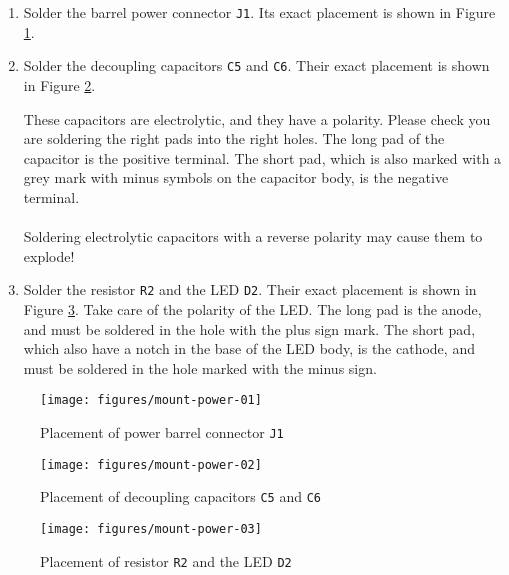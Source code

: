 \begin{enumerate}
  \item Solder the barrel power connector {\tt J1}. Its exact placement is shown in Figure \ref{fig:mount-power-01}.
  \item Solder the decoupling capacitors {\tt C5} and {\tt C6}. Their exact placement is shown in Figure \ref{fig:mount-power-02}.

        \begin{warning}
          These capacitors are electrolytic, and they have a polarity. Please check you are soldering the right pads into the right holes. The long pad of the capacitor is the positive terminal. The short pad, which is also marked with a grey mark with minus symbols on the capacitor body, is the negative terminal.\\\\

          Soldering electrolytic capacitors with a reverse polarity may cause them to explode!
        \end{warning}
  \item Solder the resistor {\tt R2} and the LED {\tt D2}. Their exact placement is shown in Figure \ref{fig:mount-power-03}. Take care of the polarity of the LED. The long pad is the anode, and must be soldered in the hole with the plus sign mark. The short pad, which also have a notch in the base of the LED body, is the cathode, and must be soldered in the hole marked with the minus sign.
\end{enumerate}

\begin{figure}[htbp]
  \centering
  \texttt{[image: figures/mount-power-01]}
  \caption{Placement of power barrel connector {\tt J1}}
  \label{fig:mount-power-01}
\end{figure}

\begin{figure}[htbp]
  \centering
  \texttt{[image: figures/mount-power-02]}
  \caption{Placement of decoupling capacitors {\tt C5} and {\tt C6}}
  \label{fig:mount-power-02}
\end{figure}

\begin{figure}[htbp]
  \centering
  \texttt{[image: figures/mount-power-03]}
  \caption{Placement of resistor {\tt R2} and the LED {\tt D2}}
  \label{fig:mount-power-03}
\end{figure}

